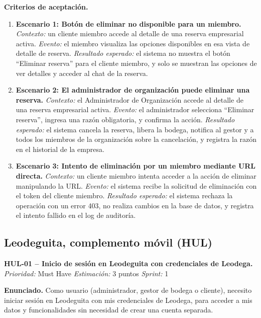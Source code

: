 \textbf{Criterios de aceptación.}
\begin{enumerate}
\item \textbf{Escenario 1: Botón de eliminar no disponible para un miembro.} \textit{Contexto:} un cliente miembro accede al detalle de una reserva empresarial activa. \textit{Evento:} el miembro visualiza las opciones disponibles en esa vista de detalle de reserva. \textit{Resultado esperado:} el sistema no muestra el botón ``Eliminar reserva'' para el cliente miembro, y solo se muestran las opciones de ver detalles y acceder al chat de la reserva.
\item \textbf{Escenario 2: El administrador de organización puede eliminar una reserva.} \textit{Contexto:} el Administrador de Organización accede al detalle de una reserva empresarial activa. \textit{Evento:} el administrador selecciona ``Eliminar reserva'', ingresa una razón obligatoria, y confirma la acción. \textit{Resultado esperado:} el sistema cancela la reserva, libera la bodega, notifica al gestor y a todos los miembros de la organización sobre la cancelación, y registra la razón en el historial de la empresa.
\item \textbf{Escenario 3: Intento de eliminación por un miembro mediante URL directa.} \textit{Contexto:} un cliente miembro intenta acceder a la acción de eliminar manipulando la URL. \textit{Evento:} el sistema recibe la solicitud de eliminación con el token del cliente miembro. \textit{Resultado esperado:} el sistema rechaza la operación con un error 403, no realiza cambios en la base de datos, y registra el intento fallido en el log de auditoría.
\end{enumerate}

\clearpage
\subsection{Leodeguita, complemento móvil (HUL)}

\textbf{HUL-01 -- Inicio de sesión en Leodeguita con credenciales de Leodega.} \label{req:HUL-01}
\textit{Prioridad:} Must Have \quad \textit{Estimación:} 3 puntos \quad \textit{Sprint:} 1

\textbf{Enunciado.} Como usuario (administrador, gestor de bodega o cliente), necesito iniciar sesión en Leodeguita con mis credenciales de Leodega, para acceder a mis datos y funcionalidades sin necesidad de crear una cuenta separada.

